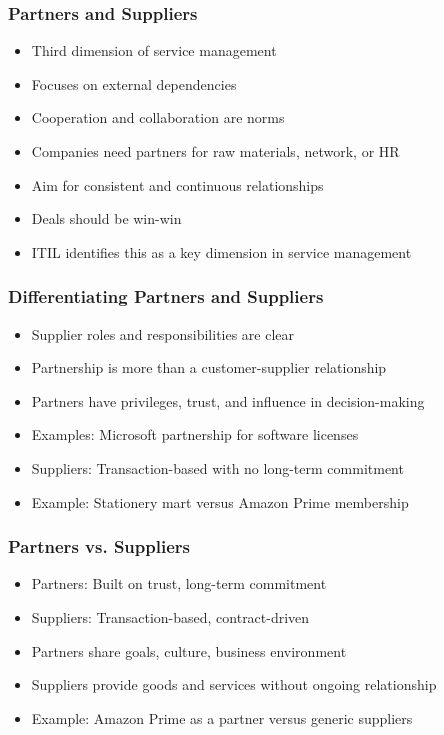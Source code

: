 \documentclass[aspectratio=169, table]{beamer}
\begin{document}
\begin{frame}
	\frametitle{Partners and Suppliers}
	\begin{itemize}
		\item Third dimension of service management
		\item Focuses on external dependencies
		\item Cooperation and collaboration are norms
		\item Companies need partners for raw materials, network, or HR
		\item Aim for consistent and continuous relationships
		\item Deals should be win-win
		\item ITIL identifies this as a key dimension in service management
	\end{itemize}
\end{frame}

\begin{frame}
	\frametitle{Differentiating Partners and Suppliers}
	\begin{itemize}
		\item Supplier roles and responsibilities are clear
		\item Partnership is more than a customer-supplier relationship
		\item Partners have privileges, trust, and influence in decision-making
		\item Examples: Microsoft partnership for software licenses
		\item Suppliers: Transaction-based with no long-term commitment
		\item Example: Stationery mart versus Amazon Prime membership
	\end{itemize}
\end{frame}

\begin{frame}
	\frametitle{Partners vs. Suppliers}
	\begin{itemize}
		\item Partners: Built on trust, long-term commitment
		\item Suppliers: Transaction-based, contract-driven
		\item Partners share goals, culture, business environment
		\item Suppliers provide goods and services without ongoing relationship
		\item Example: Amazon Prime as a partner versus generic suppliers
	\end{itemize}
\end{frame}
\end{document}
